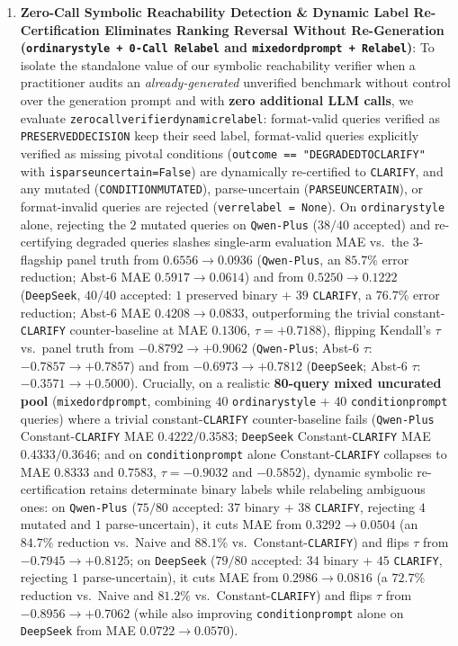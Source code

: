 \documentclass[10pt,twocolumn]{article}
\renewcommand{\_}{\textunderscore\allowbreak}
\begin{document}
\begin{enumerate}[leftmargin=*,nosep]
  \item \textbf{Zero-Call Symbolic Reachability Detection \& Dynamic Label Re-Certification Eliminates Ranking Reversal Without Re-Generation (\texttt{ordinary\_style + 0-Call Relabel} and \texttt{mixed\_ord\_prompt\_80 + Relabel})}: To isolate the standalone value of our symbolic reachability verifier when a practitioner audits an \emph{already-generated} unverified benchmark without control over the generation prompt and with \textbf{zero additional LLM calls}, we evaluate \texttt{zero\_call\_verifier\_dynamic\_relabel}: format-valid queries verified as \texttt{PRESERVED\_DECISION} keep their seed label, format-valid queries explicitly verified as missing pivotal conditions (\texttt{outcome == "DEGRADED\_TO\_CLARIFY"} with \texttt{is\_parse\_uncertain=False}) are dynamically re-certified to \texttt{CLARIFY}, and any mutated (\texttt{CONDITION\_MUTATED}), parse-uncertain (\texttt{PARSE\_UNCERTAIN}), or format-invalid queries are rejected (\texttt{ver\_relabel = None}). On \texttt{ordinary\_style} alone, rejecting the $2$ mutated queries on \texttt{Qwen-Plus} ($38/40$ accepted) and re-certifying degraded queries slashes single-arm evaluation MAE vs.\ the 3-flagship panel truth from \textbf{$0.6556 \to 0.0936$} (\texttt{Qwen-Plus}, an $85.7\%$ error reduction; Abst-6 MAE $0.5917 \to 0.0614$) and from \textbf{$0.5250 \to 0.1222$} (\texttt{DeepSeek}, $40/40$ accepted: $1$ preserved binary + $39$ \texttt{CLARIFY}, a $76.7\%$ error reduction; Abst-6 MAE $0.4208 \to 0.0833$, outperforming the trivial constant-\texttt{CLARIFY} counter-baseline at MAE $0.1306$, $\tau = +0.7188$), flipping Kendall's $\tau$ vs.\ panel truth from \textbf{$-0.8792 \to +0.9062$} (\texttt{Qwen-Plus}; Abst-6 $\tau$: $-0.7857 \to +0.7857$) and from \textbf{$-0.6973 \to +0.7812$} (\texttt{DeepSeek}; Abst-6 $\tau$: $-0.3571 \to +0.5000$). Crucially, on a realistic \textbf{80-query mixed uncurated pool} (\texttt{mixed\_ord\_prompt\_80}, combining $40$ \texttt{ordinary\_style} + $40$ \texttt{condition\_prompt} queries) where a trivial constant-\texttt{CLARIFY} counter-baseline fails (\texttt{Qwen-Plus} Constant-\texttt{CLARIFY} MAE $0.4222 / 0.3583$; \texttt{DeepSeek} Constant-\texttt{CLARIFY} MAE $0.4333 / 0.3646$; and on \texttt{condition\_prompt} alone Constant-\texttt{CLARIFY} collapses to MAE $0.8333$ and $0.7583$, $\tau = -0.9032$ and $-0.5852$), dynamic symbolic re-certification retains determinate binary labels while relabeling ambiguous ones: on \texttt{Qwen-Plus} ($75/80$ accepted: $37$ binary + $38$ \texttt{CLARIFY}, rejecting $4$ mutated and $1$ parse-uncertain), it cuts MAE from $0.3292 \to \mathbf{0.0504}$ (an \textbf{$84.7\%$} reduction vs.\ Naive and \textbf{$88.1\%$} vs.\ Constant-\texttt{CLARIFY}) and flips $\tau$ from $-0.7945 \to \mathbf{+0.8125}$; on \texttt{DeepSeek} ($79/80$ accepted: $34$ binary + $45$ \texttt{CLARIFY}, rejecting $1$ parse-uncertain), it cuts MAE from $0.2986 \to \mathbf{0.0816}$ (a \textbf{$72.7\%$} reduction vs.\ Naive and \textbf{$81.2\%$} vs.\ Constant-\texttt{CLARIFY}) and flips $\tau$ from $-0.8956 \to \mathbf{+0.7062}$ (while also improving \texttt{condition\_prompt} alone on \texttt{DeepSeek} from MAE $0.0722 \to 0.0570$).

\end{enumerate}
\end{document}
